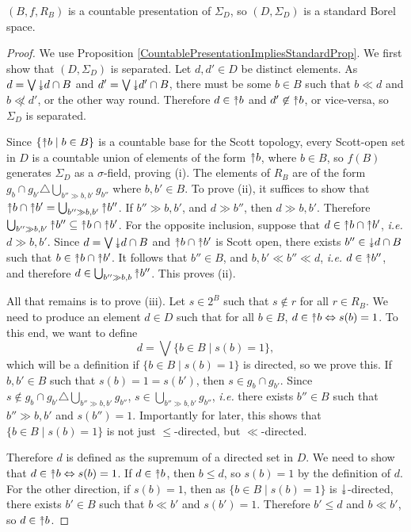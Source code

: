\documentclass{lmcs}
\newcommand{\doubledownarrow}{\rotatebox[origin=c]{-90}{$\twoheadrightarrow$}}
\newcommand{\uu}{\rotatebox[origin=c]{90}{$\twoheadrightarrow$}}
\newcommand{\dd}{\doubledownarrow}
\begin{document}
\begin{thm}
\label{ScottBorelPresentationTheorem}
$(B,f,R_B)$ is a countable presentation of $\Sigma_D$, so $(D,\Sigma_D)$ is a standard Borel space. 
\end{thm}
\begin{proof}
We use Proposition \ref{CountablePresentationImpliesStandardProp}. We first show that $(D,\Sigma_D)$ is separated. Let $d,d' \in D$ be distinct elements. As $d = \bigvee \dd d \cap B$ and $d' = \bigvee \dd d' \cap B$, there must be some $b \in B$ such that $b \ll d$ and $b \not\ll d'$, or the other way round. Therefore $d \in \uu b$ and $d' \not\in \uu b$, or vice-versa, so $\Sigma_D$ is separated. 

Since $\{ \uu b \mid b \in B \}$ is a countable base for the Scott topology, every Scott-open set in $D$ is a countable union of elements of the form $\uu b$, where $b \in B$, so $f(B)$ generates $\Sigma_D$ as a $\sigma$-field, proving (i). The elements of $R_B$ are of the form $g_b \cap g_{b'} \triangle \bigcup_{b'' \gg b,b'}g_{b''}$ where $b,b' \in B$. To prove (ii), it suffices to show that $\uu b \cap \uu b' = \bigcup_{b'' \gg b,b'}\uu b''$. If $b'' \gg b,b'$, and $d \gg b''$, then $d \gg b,b'$. Therefore $\bigcup_{b'' \gg b,b'}\uu b'' \subseteq \uu b \cap \uu b'$. For the opposite inclusion, suppose that $d \in \uu b \cap \uu b'$, \emph{i.e.} $d \gg b,b'$. Since $d = \bigvee \dd d \cap B$ and $\uu b \cap \uu b'$ is Scott open, there exists $b'' \in \dd d \cap B$ such that $b \in \uu b \cap \uu b'$. It follows that $b'' \in B$, and $b,b' \ll b'' \ll d$, \emph{i.e.} $d \in \uu b''$, and therefore $d \in \bigcup_{b'' \gg b,b}\uu b''$. This proves (ii).

All that remains is to prove (iii). Let $s \in 2^B$ such that $s \not\in r$ for all $r \in R_B$. We need to produce an element $d \in D$ such that for all $b \in B$, $d \in \uu b \Leftrightarrow s(b) = 1$. To this end, we want to define
\[
d = \bigvee \{ b \in B \mid s(b) = 1 \},
\]
which will be a definition if $\{ b \in B \mid s(b) = 1 \}$ is directed, so we prove this. If $b,b' \in B$ such that $s(b) = 1 = s(b')$, then $s \in g_b \cap g_{b'}$. Since $s \not\in g_b \cap g_{b'} \triangle \bigcup_{b'' \gg b,b'} g_{b''}$, $s \in \bigcup_{b'' \gg b,b'}g_{b''}$, \emph{i.e.} there exists $b'' \in B$ such that $b'' \gg b,b'$ and $s(b'') = 1$. Importantly for later, this shows that $\{b \in B \mid s(b) = 1 \}$ is not just $\leq$-directed, but $\ll$-directed. 

Therefore $d$ is defined as the supremum of a directed set in $D$. We need to show that $d \in \uu b \Leftrightarrow s(b) = 1$. If $d \in \uu b$, then $b \leq d$, so $s(b) = 1$ by the definition of $d$. For the other direction, if $s(b) = 1$, then as $\{ b \in B \mid s(b) = 1\}$ is $\dd$-directed, there exists $b' \in B$ such that $b \ll b'$ and $s(b') = 1$. Therefore $b' \leq d$ and $b \ll b'$, so $d \in \uu b$. 
\end{proof}
\end{document}
